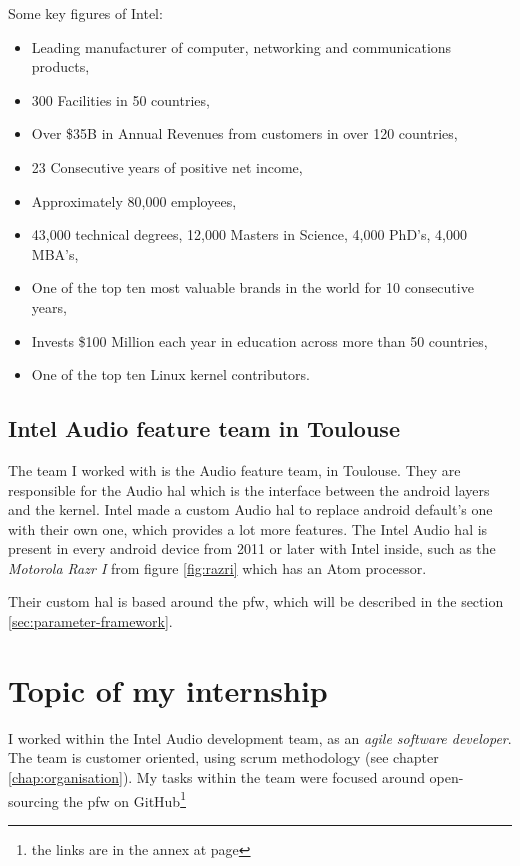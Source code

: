 Some key figures of Intel:
\begin{itemize}
\item Leading manufacturer of computer, networking and communications
  products,
  \item 300 Facilities in 50 countries,
  \item Over \$35B in Annual Revenues from customers in over 120
    countries,
\item 23 Consecutive years of positive net income,
\item Approximately 80,000 employees,
\item 43,000 technical degrees, 12,000 Masters in Science, 4,000
  PhD’s, 4,000 MBA’s,
  \item One of the top ten most valuable brands in the world for 10
    consecutive years,
\item Invests \$100 Million each year in education across more than 50
  countries,
\item One of the top ten Linux \gls{kernel} contributors.
\end{itemize}

\subsection{Intel Audio feature team in Toulouse}
The team I worked with is the Audio feature team, in Toulouse.
They are responsible for the Audio \gls{hal} which is the interface between the
\gls{android} layers and the \gls{kernel}. Intel made a custom Audio \gls{hal} to
replace \gls{android} default's one with their own one, which provides a lot more features.
The Intel Audio \gls{hal} is present in every \gls{android} device from 2011 or later with Intel inside, such
as the \emph{Motorola Razr I} from figure \ref{fig:razri} which has an Atom processor.

Their custom \gls{hal} is based around the \gls{pfw}, which will be described in the section \ref{sec:parameter-framework}.


\section{Topic of my internship}
I worked within the Intel Audio development team, as an \emph{agile
software developer}. The team is customer oriented, using \gls{scrum}
methodology (see chapter \ref{chap:organisation}). My tasks
within the team were focused around open-sourcing the \gls{pfw} on
\gls{GitHub}\footnote{the links are in the annex at page \pageref{chap:annex}}


